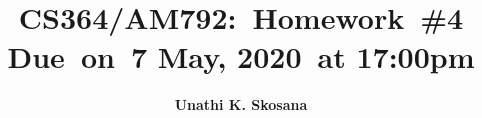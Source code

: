 

\newcommand{\hmwkTitle}{Homework\ \#4}
\newcommand{\hmwkDueDate}{7 May, 2020}
\newcommand{\hmwkClass}{CS364/AM792}
\newcommand{\hmwkAuthorName}{\textbf{Unathi K. Skosana}}


\title{
    \vspace{2in}
    \textmd{\textbf{\hmwkClass:\ \hmwkTitle}}\\
    \normalsize\vspace{0.1in}\small{Due\ on\ \hmwkDueDate\ at 17:00pm}\\
    \vspace{3in}
}

\author{\hmwkAuthorName}
\date{}

\renewcommand{\part}[1]{\textbf{\large Part \Alph{partCounter}}\stepcounter{partCounter}\\}

\newcommand{\solution}{\textbf{\large Solution}}



\maketitle

\pagebreak

